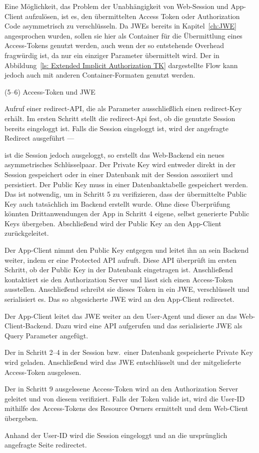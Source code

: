 Eine Möglichkeit, das Problem der Unabhängigkeit von Web-Session und App-Client
aufzulösen, ist es, den übermittelten Access Token oder Authorization Code
asymmetrisch zu verschlüsseln. Da JWEs bereits in Kapitel~\ref{ch:JWE}
angesprochen wurden, sollen sie hier als Container für die Übermittlung eines
Access-Tokens genutzt werden, auch wenn der so entstehende Overhead fragwürdig
ist, da nur ein einziger Parameter übermittelt wird. Der in
Abbildung~\ref{ls: Extended Implicit Authorization TK} dargestellte Flow kann
jedoch auch mit anderen Container-Formaten genutzt werden.
\begin{labeling}{(5--6) Access-Token und JWE}
    \item [(1) propose/redirect] Aufruf einer redirect-API, die als Parameter
    ausschließlich einen redirect-Key erhält. Im ersten Schritt stellt die
    redirect-Api fest, ob die genutzte Session bereits eingeloggt ist. Falls die
    Session eingeloggt ist, wird der angefragte Redirect ausgeführt ---
    \item[(2--4) Key proposal] ist die Session jedoch ausgeloggt, so erstellt
    das Web-Backend ein neues asymmetrisches Schlüsselpaar. Der Private Key wird
    entweder direkt in der Session gespeichert oder in einer Datenbank mit der
    Session assoziiert und persistiert. Der Public Key muss in einer
    Datenbanktabelle gespeichert werden. Das ist notwendig, um in Schritt 5 zu
    verifizieren, dass der übermittelte Public Key auch tatsächlich im Backend
    erstellt wurde. Ohne diese Überprüfung könnten Drittanwendungen der App in
    Schritt 4 eigene, selbst generierte Public Keys  übergeben. Abschließend
    wird der Public Key an den App-Client zurückgeleitet.
    \item[(5--6) Authorization Grant] Der App-Client nimmt den Public Key
    entgegen und leitet ihn an sein Backend weiter, indem er eine Protected API
    aufruft. Diese API überprüft im ersten Schritt, ob der Public Key in der
    Datenbank eingetragen ist. Anschließend kontaktiert sie den Authorization
    Server und lässt sich einen Access-Token ausstellen. Anschließend schreibt
    sie dieses Token in ein JWE, verschlüsselt und serialisiert es. Das so
    abgesicherte JWE wird an den App-Client redirectet.
    \item[(7--8) JWE Weiterleitung] Der App-Client leitet das JWE weiter an
    den User-Agent und dieser an das Web-Client-Backend. Dazu wird eine
    API aufgerufen und das serialisierte JWE als Query Parameter angefügt.
    \item[(9) JWE Entschlüsselung] Der in Schritt 2--4 in der Session bzw.\
    einer Datenbank gespeicherte Private Key wird geladen. Anschließend wird das
    JWE entschlüsselt und der mitgelieferte Access-Token ausgelesen.
    \item[(10--11) User Identifizierung] Der in Schritt 9 ausgelesene
    Access-Token wird an den Authorization Server geleitet und von diesem
    verifiziert. Falls der Token valide ist, wird die User-ID mithilfe des
    Access-Tokens des Resource Owners ermittelt und dem Web-Client übergeben.
    \item[(12--13) Login \& Redirect] Anhand der User-ID wird die Session
    eingeloggt und an die ursprünglich angefragte Seite redirectet.
\end{labeling}
